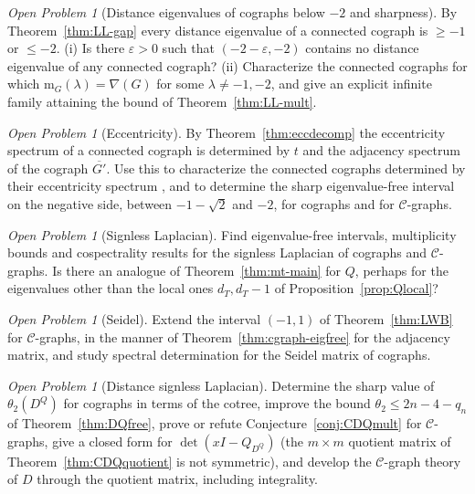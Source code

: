 \documentclass[11pt]{article}
\theoremstyle{plain}
\theoremstyle{definition}
\theoremstyle{remark}
\newtheorem{openproblem}[theorem]{Open Problem}
\begin{document}
	\begin{openproblem}[Distance eigenvalues of cographs below $-2$ and sharpness]
		\label{op:D}
		By Theorem~\ref{thm:LL-gap} every distance eigenvalue of a connected cograph is $\ge-1$ or $\le-2$. (i) Is there $\varepsilon>0$ such that $(-2-\varepsilon,-2)$ contains no distance eigenvalue of any connected cograph? (ii) Characterize the connected cographs for which $\mathrm m_G(\lambda)=\nabla(G)$ for some $\lambda\ne-1,-2$, and give an explicit infinite family attaining the bound of Theorem~\ref{thm:LL-mult}.
	\end{openproblem}
	
	\begin{openproblem}[Eccentricity]
		\label{op:ecc}
		By Theorem~\ref{thm:eccdecomp} the eccentricity spectrum of a connected cograph is determined by $t$ and the adjacency spectrum of the cograph $\overline{G'}$. Use this to characterize the connected cographs determined by their eccentricity spectrum , and to determine the sharp eigenvalue-free interval on the negative side, between $-1-\sqrt2$ and $-2$, for cographs and for $\mathcal{C}$-graphs.
	\end{openproblem}
	
	\begin{openproblem}[Signless Laplacian]
		\label{op:Q}
		Find eigenvalue-free intervals, multiplicity bounds and cospectrality results for the signless Laplacian of cographs and $\mathcal{C}$-graphs. Is there an analogue of Theorem~\ref{thm:mt-main} for $Q$, perhaps for the eigenvalues other than the local ones $d_T,d_T-1$ of Proposition~\ref{prop:Qlocal}?
	\end{openproblem}
	
	\begin{openproblem}[Seidel]
		\label{op:seidel}
		Extend the interval $(-1,1)$ of Theorem~\ref{thm:LWB} for $\mathcal{C}$-graphs, in the manner of Theorem~\ref{thm:cgraph-eigfree} for the adjacency matrix, and study spectral determination for the Seidel matrix of cographs.
	\end{openproblem}
	
	\begin{openproblem}[Distance signless Laplacian]
		\label{op:DQ}
		Determine the sharp value of $\theta_2(D^Q)$ for cographs in terms of the cotree, improve the bound $\theta_2\le2n-4-q_n$ of Theorem~\ref{thm:DQfree}, prove or refute Conjecture~\ref{conj:CDQmult} for $\mathcal C$-graphs, give a closed form for $\det(xI-Q_{D^Q})$ (the $m\times m$ quotient matrix of Theorem~\ref{thm:CDQquotient} is not symmetric), and develop the $\mathcal{C}$-graph theory of $D$ through the quotient matrix, including integrality.
	\end{openproblem}
	
\end{document}
